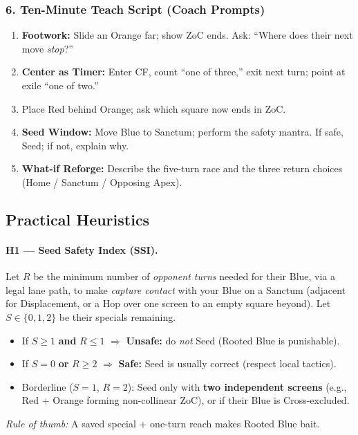 \documentclass[11pt]{article}
\begin{document}
\subsubsection*{6. Ten-Minute Teach Script (Coach Prompts)}
\begin{enumerate}\itemsep0.25em
  \item \textbf{Footwork:} Slide an Orange far; show ZoC ends. Ask: “Where does their next move \emph{stop}?”
  \item \textbf{Center as Timer:} Enter CF, count “one of three,” exit next turn; point at exile “one of two.”
  \item {} Place Red behind Orange; ask which square now ends in ZoC.
  \item \textbf{Seed Window:} Move Blue to Sanctum; perform the safety mantra. If safe, Seed; if not, explain why.
  \item \textbf{What-if Reforge:} Describe the five-turn race and the three return choices (Home / Sanctum / Opposing Apex).
\end{enumerate}

\subsection*{Practical Heuristics}
\paragraph{H1 — Seed Safety Index (SSI).}
Let $R$ be the minimum number of \emph{opponent turns} needed for their Blue, via a legal lane path, to make \emph{capture contact} with your Blue on a Sanctum (adjacent for Displacement, or a Hop over one screen to an empty square beyond). Let $S\in\{0,1,2\}$ be their specials remaining.
\begin{itemize}
  \item If $S\ge 1$ \textbf{and} $R\le 1$ $\Rightarrow$ \textbf{Unsafe:} do \emph{not} Seed (Rooted Blue is punishable).
  \item If $S=0$ \textbf{or} $R\ge 2$ $\Rightarrow$ \textbf{Safe:} Seed is usually correct (respect local tactics).
  \item Borderline ($S=1$, $R=2$): Seed only with \textbf{two independent screens} (e.g., Red + Orange forming non-collinear ZoC), or if their Blue is Cross-excluded.
\end{itemize}
\emph{Rule of thumb:} A saved special + one-turn reach makes Rooted Blue bait.
\end{document}
